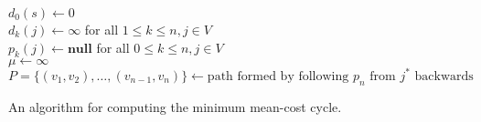 \documentclass[letterpaper,reqno,12pt]{article}
\begin{document}
\begin{algorithm}
  $d_0(s) \leftarrow 0$ \\
  $d_k(j) \leftarrow \infty$ for all $1 \leq k \leq n, j \in V$ \\
  $p_k(j) \leftarrow \textbf{null}$ for all $0 \leq k \leq n, j \in V$ \\
  $\mu \leftarrow \infty$ \\
  $P = \{ (v_1, v_2), \ldots, (v_{n - 1}, v_n) \} \leftarrow \text{path formed by following $p_n$ from $j^*$ backwards}$ \\
  \caption{An algorithm for computing the minimum mean-cost cycle.}
  \label{alg:min-mean-cost-cycle}
\end{algorithm}



\end{document}
